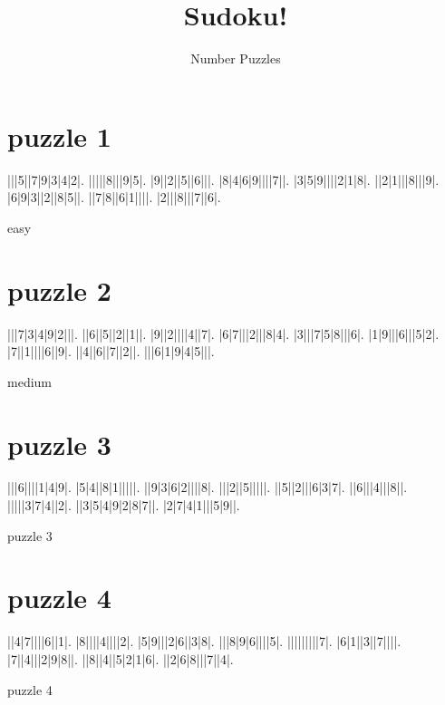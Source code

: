 \documentclass[fontsize=24pt,letterpaper]{scrartcl}
\title{Sudoku!}
\author{Number Puzzles}
\begin{document}
\maketitle
\setcounter{page}{0}
\thispagestyle{empty}
\clearpage

\section{puzzle 1}
\vspace{2cm}
\begin{sudoku}
|||5||7|9|3|4|2|.
|||||8|||9|5|.
|9||2||5||6|||.
|8|4|6|9||||7||.
|3|5|9||||2|1|8|.
||2|1|||8|||9|.
|6|9|3||2||8|5||.
||7|8||6|1||||.
|2|||8|||7||6|.
\end{sudoku}
\begin{center}
    easy
\end{center}

\clearpage

\section{puzzle 2}
\vspace{2cm}
\begin{sudoku}
|||7|3|4|9|2|||.
||6||5||2||1||.
|9||2||||4||7|.
|6|7|||2|||8|4|.
|3|||7|5|8|||6|.
|1|9|||6|||5|2|.
|7||1||||6||9|.
||4||6||7||2||.
|||6|1|9|4|5|||.
\end{sudoku}
\begin{center}
   medium
\end{center}

\clearpage
\section{puzzle 3}
\vspace{2cm}
\begin{sudoku}
|||6||||1|4|9|.
|5|4||8|1|||||.
||9|3|6|2||||8|.
|||2||5|||||.
||5||2|||6|3|7|.
||6|||4|||8||.
|||||3|7|4||2|.
||3|5|4|9|2|8|7||.
|2|7|4|1|||5|9||.
\end{sudoku}
\begin{center}
    puzzle 3
\end{center}

\clearpage
\section{puzzle 4}
\vspace{2cm}
\begin{sudoku}
||4|7||||6||1|.
|8||||4||||2|.
|5|9|||2|6||3|8|.
|||8|9|6||||5|.
|||||||||7|.
|6|1||3||7||||.
|7||4|||2|9|8||.
||8||4||5|2|1|6|.
||2|6|8|||7||4|.
\end{sudoku}
\begin{center}
    puzzle 4
\end{center}
\end{document}
